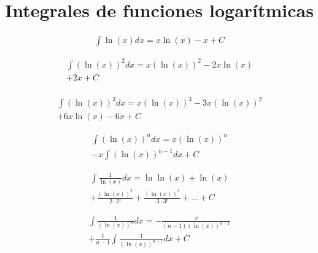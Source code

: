 \documentclass{article}
\begin{document}
\section{Integrales de funciones logarítmicas}
\begin{multicols}{2}
\begin{equation*}
\begin{aligned}
\int \ln(x) dx = x \ln(x) - x + C
\end{aligned}
\end{equation*}

\begin{equation*}
\begin{aligned}
\int (\ln(x))^{2} dx = x (\ln(x))^{2}-2x\ln(x)\\ +2 x + C \\
\end{aligned}
\end{equation*}

\begin{equation*}
\begin{aligned}
\int (\ln(x))^{3} dx = x (\ln(x))^{3}- 3x (\ln(x))^{2}\\+6x\ln(x) -6x + C
\end{aligned}
\end{equation*}

\begin{equation*}
\begin{aligned}
\int (\ln(x))^{n} dx = x (\ln(x))^{n}\\- x \int(\ln(x))^{n-1} dx + C
\end{aligned}
\end{equation*}

\begin{equation*}
\begin{aligned}
\int\frac{1}{\ln(x)}  dx =\ln\ln(x)+\ln(x)\\+\frac{(\ln(x))^{2}}{2\cdot2!}+\frac{(\ln(x))^{3}}{3\cdot3!} +\hdots+ C
\end{aligned}
\end{equation*}

\begin{equation*}
\begin{aligned}
\int\frac{1}{(\ln(x))^{n}}  dx = -\frac{x}{(n-1)(\ln(x))^{n-1}} \\+\frac{1}{n-1} \int\frac{1}{(\ln(x))^{n-1}}  dx+C
\end{aligned}
\end{equation*}

\end{multicols}
\newpage

\end{document}
